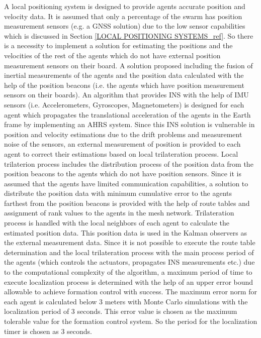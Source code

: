A	local positioning system is designed to provide agents accurate position and velocity data. It is assumed that only a percentage of the swarm has position measurement sensors (e.g. a GNSS solution) due to the low sensor capabilities which is discussed in Section \ref{LOCAL POSITIONING SYSTEMS_ref}. So there is a necessity to implement a solution for estimating the positions and the velocities of the rest of the agents which do not have external position measurement sensors on their board.  A solution proposed including the fusion of inertial measurements of the agents and the position data calculated with the help of the position beacons (i.e. the agents which have position measurement sensors on their boards). An algorithm that provides INS with the help of IMU sensors (i.e. Accelerometers, Gyroscopes, Magnetometers) is designed for each agent which propagates the translational acceleration of the agents in the Earth frame by implementing an AHRS system. Since this INS solution is vulnerable in position and velocity estimations due to the drift problems and measurement noise of the sensors, an external measurement of position is provided to each agent to correct their estimations based on local trilateration process. Local trilaterion process includes the distribution process of the position data from the position beacons to the agents which do not have position sensors. Since it is assumed that the agents have limited communication capabilities, a solution to distribute the position data with minimum cumulative error to the agents farthest from the position beacons is provided with the help of route tables and assignment of rank values to the agents in the mesh network. Trilateration process is handled with the local neighbors of each agent to calculate the estimated position data. This position data is used in the Kalman observers as the external measurement data. Since it is not possible to execute the route table determination and the local trilateration process with the main process period of the agents (which controls the actuators, propagates INS measurements etc.) due to the computational complexity of the algorithm, a maximum period of time to execute localization process is determined with the help of an upper error bound allowable to achieve formation control with success. The maximum error norm for each agent is calculated below 3 meters with Monte Carlo simulations with the localization period of 3 seconds. This error value is chosen as the maximum tolerable value for the formation control system. So the period for the localization timer is chosen as 3 seconds.
       
